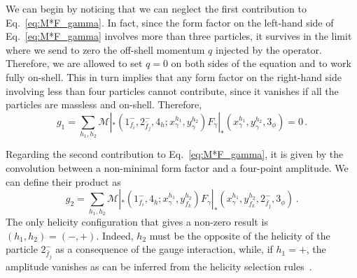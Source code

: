 We can begin by noticing that we can neglect the first contribution to Eq.~\eqref{eq:M*F_gamma}.
In fact, since the form factor on the left-hand side of Eq.~\eqref{eq:M*F_gamma} involves more than three particles, it survives in the limit where we send to zero the off-shell momentum $q$ injected by the operator.
Therefore, we are allowed to set $q=0$ on both sides of the equation and to work fully on-shell.
This in turn implies that any form factor on the right-hand side involving less than four particles cannot contribute, since it vanishes if all the particles are massless and on-shell.
Therefore,
\begin{equation}
    g_1=\sum_{h_1,h_2}\mathcal M|_*(1_{f_i}^-,2_{\bar f_j}^-,4_h;x_\gamma^{h_1},y_\gamma^{h_2}) F_\gamma|_*(x_\gamma^{h_1},y_\gamma^{h_2},3_\phi)=0\,.
\end{equation}

Regarding the second contribution to Eq.~\eqref{eq:M*F_gamma}, it is given by the convolution between a non-minimal form factor and a four-point amplitude.
We can define their product as
\begin{equation}
    g_2=\sum_{h_1,h_2} \mathcal M|_*(1_{ f_i}^-,4_h;x_\gamma^{h_1},y_{ f_k}^{h_2}) F_\gamma|_*(x_\gamma^{h_1},y_{ f_k}^{h_2},2_{\bar f_j}^-,3_\phi)\,.
\end{equation}
The only helicity configuration that gives a non-zero result is $(h_1,h_2)=(-,+)$.
Indeed, $h_2$ must be the opposite of the helicity of the particle $2^-_{\bar f_j}$ as a consequence of the gauge interaction,
while, if $h_1=+$, the amplitude vanishes as can be inferred from the helicity selection rules~\cite{Grisaru:1977px,Grisaru:1976vm,Mangano:1990by,Cheung:2015aba,Parke:1985pn,Azatov:2016sqh}.

